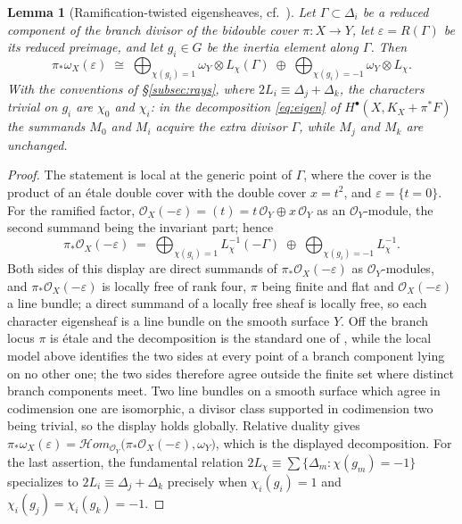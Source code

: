 \documentclass{amsart}
\newtheorem{lemma}[theorem]{Lemma}
\theoremstyle{definition}
\newcommand{\OO}{\mathcal{O}}
\begin{document}
\begin{lemma}[Ramification-twisted eigensheaves, cf.\ \cite{Par91}]\label{lem:ramtwist}
Let $\Gamma\subset\Delta_i$ be a reduced component of the branch divisor of the bidouble cover $\pi:X\to Y$, let $\varepsilon=R(\Gamma)$ be its reduced preimage, and let $g_i\in G$ be the inertia element along $\Gamma$. Then
\[
\pi_*\omega_X(\varepsilon)\;\cong\;
\bigoplus_{\chi(g_i)=1}\omega_Y\otimes L_\chi(\Gamma)
\;\oplus\;
\bigoplus_{\chi(g_i)=-1}\omega_Y\otimes L_\chi .
\]
With the conventions of \S\ref{subsec:rays}, where $2L_i\equiv\Delta_j+\Delta_k$, the characters trivial on $g_i$ are $\chi_0$ and $\chi_i$: in the decomposition \eqref{eq:eigen} of $H^\bullet(X,K_X+\pi^*F)$ the summands $M_0$ and $M_i$ acquire the extra divisor $\Gamma$, while $M_j$ and $M_k$ are unchanged.
\end{lemma}

\begin{proof}
The statement is local at the generic point of $\Gamma$, where the cover is the product of an \'etale double cover with the double cover $x=t^2$, and $\varepsilon=\{t=0\}$. For the ramified factor, $\OO_X(-\varepsilon)=(t)=t\,\OO_Y\oplus x\,\OO_Y$ as an $\OO_Y$-module, the second summand being the invariant part; hence
\[
\pi_*\OO_X(-\varepsilon)\;=\;\bigoplus_{\chi(g_i)=1}L_\chi^{-1}(-\Gamma)\;\oplus\;\bigoplus_{\chi(g_i)=-1}L_\chi^{-1} .
\]
Both sides of this display are direct summands of $\pi_*\OO_X(-\varepsilon)$ as $\OO_Y$-modules, and $\pi_*\OO_X(-\varepsilon)$ is locally free of rank four, $\pi$ being finite and flat and $\OO_X(-\varepsilon)$ a line bundle; a direct summand of a locally free sheaf is locally free, so each character eigensheaf is a line bundle on the smooth surface $Y$. Off the branch locus $\pi$ is \'etale and the decomposition is the standard one of \cite{Par91}, while the local model above identifies the two sides at every point of a branch component lying on no other one; the two sides therefore agree outside the finite set where distinct branch components meet. Two line bundles on a smooth surface which agree in codimension one are isomorphic, a divisor class supported in codimension two being trivial, so the display holds globally. Relative duality gives $\pi_*\omega_X(\varepsilon)=\mathcal{H}om_{\OO_Y}\bigl(\pi_*\OO_X(-\varepsilon),\omega_Y\bigr)$, which is the displayed decomposition. For the last assertion, the fundamental relation $2L_\chi\equiv\sum\{\Delta_m:\chi(g_m)=-1\}$ specializes to $2L_i\equiv\Delta_j+\Delta_k$ precisely when $\chi_i(g_i)=1$ and $\chi_i(g_j)=\chi_i(g_k)=-1$.
\end{proof}
\end{document}
